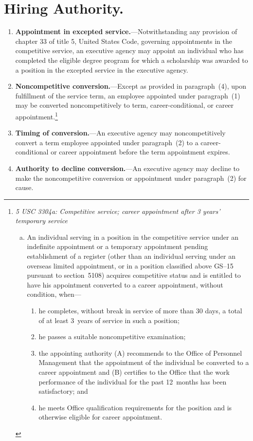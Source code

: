 \documentclass{article}
\begin{document}
    \section{Hiring Authority.}
\begin{enumerate}
            \item {\bf Appointment in excepted service.}---Notwithstanding any 
        provision of chapter 33 of title 5, United States Code, 
        governing appointments in the competitive service, an executive 
        agency may appoint an individual who has completed the eligible 
        degree program for which a scholarship was awarded to a 
        position in the excepted service in the executive agency.
            \item {\bf Noncompetitive conversion.}---Except as provided in 
        paragraph~(4), upon fulfillment of the service term, an 
        employee appointed under paragraph~(1) may be converted 
        noncompetitively to term, career-conditional, or career 
        appointment.\footnote{{\em 5 USC 3304a: Competitive service; career appointment after 3 years' temporary service}
        \begin{enumerate}[(a)]
        \item An individual serving in a position in the competitive service under an indefinite appointment or a temporary appointment pending establishment of a register (other than an individual serving under an overseas limited appointment, or in a position classified above GS–15 pursuant to section~5108) acquires competitive status and is entitled to have his appointment converted to a career appointment, without condition, when---
        \begin{enumerate}[(1)]
        \item he completes, without break in service of more than 30 days, a total of at least 3~years of service in such a position;
        \item he passes a suitable noncompetitive examination;
        \item the appointing authority (A) recommends to the Office of Personnel Management that the appointment of the individual be converted to a career appointment and (B) certifies to the Office that the work performance of the individual for the past 12~months has been satisfactory; and
        \item he meets Office qualification requirements for the position and is otherwise eligible for career appointment.
        \end{enumerate}
        \end{enumerate}
        }
            \item {\bf Timing of conversion.}---An executive agency may 
        noncompetitively convert a term employee appointed under 
        paragraph~(2) to a career-conditional or career appointment 
        before the term appointment expires.
            \item {\bf Authority to decline conversion.}---An executive agency 
        may decline to make the noncompetitive conversion or 
        appointment under paragraph~(2) for cause.
\end{enumerate}
\end{document}
